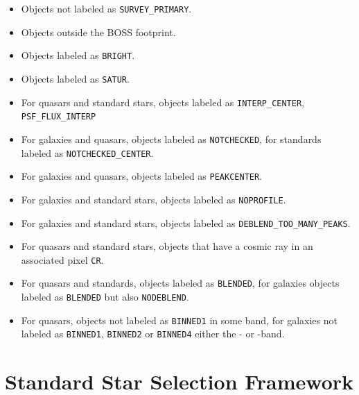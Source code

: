 \documentclass[12pt,preprint]{aastex}
\newcommand{\primary}{\texttt{SURVEY\_PRIMARY}}
\begin{document}
\begin{itemize}

    \item Objects not labeled as \primary.

    \item Objects outside the BOSS footprint.

    \item Objects labeled as \texttt{BRIGHT}.

    \item Objects labeled as \texttt{SATUR}.

    \item For quasars and standard stars, objects
        labeled as \texttt{INTERP\_CENTER}, 
        \texttt{PSF\_FLUX\_INTERP}

    \item For galaxies and quasars, objects labeled
        as \texttt{NOTCHECKED}, for standards labeled
        as \texttt{NOTCHECKED\_CENTER}.

    \item For galaxies and quasars, objects labeled as
        \texttt{PEAKCENTER}.

    \item For galaxies and standard stars, objects labeled
        as \texttt{NOPROFILE}.

    \item For galaxies and standard stars, objects labeled as 
        \texttt{DEBLEND\_TOO\_MANY\_PEAKS}.

    \item For quasars and standard stars, objects that have
        a cosmic ray in an associated pixel \texttt{CR}.
    
    \item For quasars and standards, objects labeled
        as \texttt{BLENDED}, for galaxies objects labeled
        as \texttt{BLENDED} but also \texttt{NODEBLEND}.


    \item For quasars, objects not labeled as \texttt{BINNED1} in some band, 
    for galaxies not labeled as \texttt{BINNED1}, \texttt{BINNED2}
    or \texttt{BINNED4} either the \rmag- or \imag-band.
   
\end{itemize}

\section{Standard Star Selection Framework} \label{sec:std}
\end{document}
